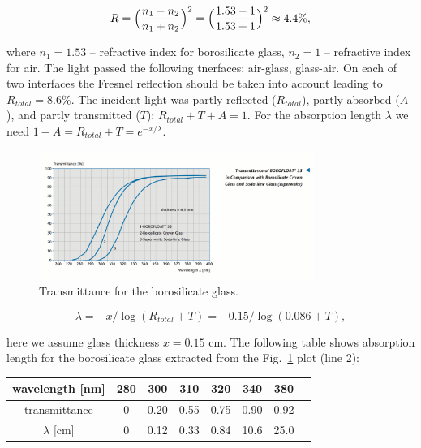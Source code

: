 \documentclass[11pt, a4paper]{article}
\begin{document}
\begin{equation}
R = \Bigl( \frac{n_1 - n_2}{n_1 + n_2} \Bigr)^{2} = \Bigl( \frac{1.53 - 1}{1.53 + 1} \Bigr) ^{2} \approx 4.4\%,
\label{eq:fre}
\end{equation}

\noindent where $n_1 = 1.53$ -- refractive index for borosilicate glass, $n_2 = 1$ -- refractive index for air. The light passed the following tnerfaces: air-glass, glass-air. On each of two interfaces the Fresnel reflection should be taken into account leading to $R_{total} = 8.6\%$. The incident light was partly reflected ($R_{total}$), partly absorbed ($A$), and partly transmitted ($T$): $ R_{total} + T + A = 1$. For the absorption length $\lambda$ we need $1 - A = R_{total} + T = e^{-x/\lambda}$. 

\begin{figure}[htb]
\centering
\includegraphics[angle=0,width=0.8\textwidth]{pics/glass.png}
\caption{\label{pic:gla}
Transmittance for the borosilicate glass.
}
\end{figure}

\begin{equation}
\lambda = -x/\log(R_{total}+T) = -0.15/\log(0.086+T),
\label{eq:lam}
\end{equation}

\noindent here we assume glass thickness $x = 0.15$ cm. The following table shows absorption length for the borosilicate glass extracted from the Fig.~\ref{pic:gla} plot (line 2):

\begin{center}
\begin{tabular}{| c | c | c | c | c | c | c | c |}
\hline
wavelength [nm] & 280 & 300 & 310 & 320 & 340 & 380 \\
\hline
transmittance & 0 & 0.20 & 0.55 & 0.75 & 0.90 & 0.92 \\
\hline
$\lambda$ [cm] & 0 & 0.12 & 0.33 & 0.84 & 10.6 & 25.0 \\
\hline
\end{tabular}
\end{center}
\end{document}
